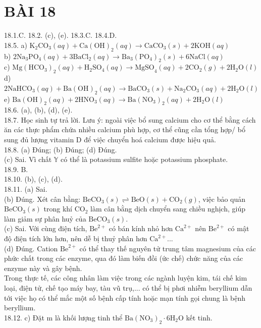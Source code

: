 \documentclass[10pt]{article}
\begin{document}
\section*{BÀI 18}
18.1.C. 18.2. (c), (e). 18.3.C. 18.4.D.\\
18.5. a) $\mathrm{K}_{2} \mathrm{CO}_{3}(a q)+\mathrm{Ca}(\mathrm{OH})_{2}(a q) \rightarrow \mathrm{CaCO}_{3}(s)+2 \mathrm{KOH}(a q)$\\
b) $2 \mathrm{Na}_{3} \mathrm{PO}_{4}(a q)+3 \mathrm{BaCl}_{2}(a q) \rightarrow \mathrm{Ba}_{3}\left(\mathrm{PO}_{4}\right)_{2}(s)+6 \mathrm{NaCl}(a q)$\\
c) $\mathrm{Mg}\left(\mathrm{HCO}_{3}\right)_{2}(a q)+\mathrm{H}_{2} \mathrm{SO}_{4}(a q) \rightarrow \mathrm{MgSO}_{4}(a q)+2 \mathrm{CO}_{2}(g)+2 \mathrm{H}_{2} \mathrm{O}(l)$\\
d) $2 \mathrm{NaHCO}_{3}(a q)+\mathrm{Ba}(\mathrm{OH})_{2}(a q) \rightarrow \mathrm{BaCO}_{3}(s)+\mathrm{Na}_{2} \mathrm{CO}_{3}(a q)+2 \mathrm{H}_{2} \mathrm{O}(l)$\\
e) $\mathrm{Ba}(\mathrm{OH})_{2}(a q)+2 \mathrm{HNO}_{3}(a q) \rightarrow \mathrm{Ba}\left(\mathrm{NO}_{3}\right)_{2}(a q)+2 \mathrm{H}_{2} \mathrm{O}(l)$\\
18.6. (a), (b), (d), (e).\\
18.7. Học sinh tự trả lời. Lưu ý: ngoài việc bổ sung calcium cho cơ thể bằng cách ăn các thực phẩm chứa nhiều calcium phù hợp, cơ thể cũng cần tổng hợp/ bổ sung đủ lượng vitamin D để việc chuyển hoá calcium được hiệu quả.\\
18.8. (a) Đúng; (b) Đúng; (d) Đúng.\\
(c) Sai. Vì chất $\mathbb{Y}$ có thể là potassium sulfite hoặc potassium phosphate.\\
18.9. B.\\
18.10. (b), (c), (d).\\
18.11. (a) Sai.\\
(b) Đúng. Xét cân bằng: $\mathrm{BeCO}_{3}(s) \rightleftharpoons \mathrm{BeO}(s)+\mathrm{CO}_{2}(g)$, việc bảo quản $\mathrm{BeCO}_{3}(s)$ trong khí $\mathrm{CO}_{2}$ làm cân bằng dịch chuyển sang chiều nghịch, giúp làm giảm sự phân huỷ của $\mathrm{BeCO}_{3}(s)$.\\
(c) Sai. Với cùng điện tích, $\mathrm{Be}^{2+}$ có bán kính nhỏ hơn $\mathrm{Ca}^{2+}$ nên $\mathrm{Be}^{2+}$ có mật độ điện tích lớn hơn, nên dễ bị thuỷ phân hơn $\mathrm{Ca}^{2+}$...\\
(d) Đúng. Cation $\mathrm{Be}^{2+}$ có thể thay thế nguyên tử trung tâm magnesium của các phức chất trong các enzyme, qua đó làm biến đồi (ức chế) chức năng của các enzyme này và gây bệnh.\\
Trong thực tế, các công nhân làm việc trong các ngành luyện kim, tái chế kim loại, điện tử, chế tạo máy bay, tàu vũ trụ,... có thể bị phơi nhiễm beryllium dẫn tới việc họ có thể mắc một số bệnh cấp tính hoặc mạn tính gọi chung là bệnh beryllium.\\
18.12. c) Đặt m là khối lượng tinh thể $\mathrm{Ba}\left(\mathrm{NO}_{3}\right)_{2} \cdot 6 \mathrm{H}_{2} \mathrm{O}$ kết tinh.
\end{document}
